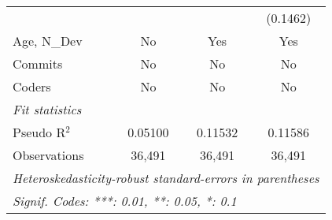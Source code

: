 \begin{tabular}{lccc}
                                                         &                &                & (0.1462)\\   
   Age, N\_Dev                                           & No             & Yes            & Yes\\  
   Commits                                               & No             & No             & No\\  
   Coders                                                & No             & No             & No\\  
   \midrule
   \emph{Fit statistics}\\
   Pseudo R$^2$                                          & 0.05100        & 0.11532        & 0.11586\\  
   Observations                                          & 36,491         & 36,491         & 36,491\\  
   \midrule \midrule
   \multicolumn{4}{l}{\emph{Heteroskedasticity-robust standard-errors in parentheses}}\\
   \multicolumn{4}{l}{\emph{Signif. Codes: ***: 0.01, **: 0.05, *: 0.1}}\\
\end{tabular}
\par\endgroup


